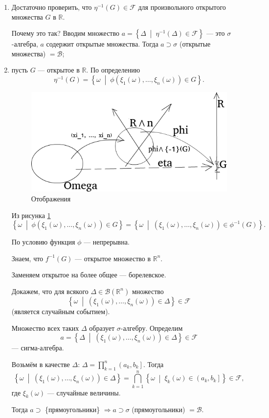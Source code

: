 \begin{enumerate}
\item Достаточно проверить, что $ \eta^{-1} \left( G \right) \in \mathcal{F} $ для произвольного открытого множества $G$ в $ \mathbb{R} $.

Почему это так?
Вводим множество $a = \left\{ \Delta \; \middle| \; \eta^{-1} \left( \Delta \right) \in \mathcal{F} \right\} $ --- это $ \sigma $-алгебра, $a$ содержит открытые множества.
Тогда $a \supset \sigma $ (открытые множества) $= \mathcal{B} $;
\item пусть $G$ --- открытое в $ \mathbb{R} $.
По определению
$$ \eta^{-1} \left( G \right) =
\left\{ \omega \; \middle| \; \phi \left( \xi_1 \left( \omega \right), \dotsc, \xi_n \left( \omega \right) \right) \in G \right\}.$$

\begin{figure}[h!]
  \centering
  \includegraphics[width=.4\textwidth]{./pictures/8_12.png}
  \caption{Отображения}
  \label{fig:812}
\end{figure}

Из рисунка \ref{fig:812}
$$ \left\{ \omega \; \middle| \; \phi \left( \xi_1 \left( \omega \right), \dotsc, \xi_n \left( \omega \right) \right) \in G \right\} =
\left\{ \omega \; \middle| \; \left( \xi_1 \left( \omega \right), \dotsc, \xi_n \left( \omega \right) \right) \in \phi^{-1} \left( G \right) \right\}.$$

По условию функция $ \phi $ --- непрерывна.

Знаем, что $f^{-1} \left( G \right) $ --- открытое множество в $ \mathbb{R}^n$.

Заменяем открытое на более общее --- борелевское.

Докажем,
что для всякого
$ \Delta \in \mathcal{B} \left( \mathbb{R}^n \right) $
множество
$$ \left\{ \omega \; \middle| \; \left( \xi_1 \left( \omega \right), \dotsc, \xi_n \left( \omega \right) \right) \in \Delta \right\} \in \mathcal{F} $$
(является случайным событием).

Множество всех таких $ \Delta $ образует $ \sigma $-алгебру.
Определим
$$a =
\left\{ \Delta \; \middle| \; \left( \xi_1 \left( \omega \right), \dotsc, \xi_n \left( \omega \right) \right) \in \Delta \right\} \in \mathcal{F} $$
--- сигма-алгебра.

Возьмём в качестве $ \Delta: \, \Delta = \prod \limits_{k=1}^n \left( a_k, b_k \right] $.
Тогда
$$ \left\{ \omega \; \middle| \; \left( \xi_1 \left( \omega \right), \dotsc, \xi_n \left( \omega \right) \right) \in \Delta \right\} =
\bigcap \limits_{k=1}^n \left\{ \omega \; \middle| \; \xi_k \left( \omega \right) \in \left( a_k, b_k \right] \right\} \in \mathcal{F},$$
где $ \xi_k \left( \omega \right) $ --- случайные величины.

Тогда $a \supset $ \{прямоугольники\} $ \Rightarrow a \supset \sigma $ (прямоугольники) $= \mathcal{B} $.

\end{enumerate}

